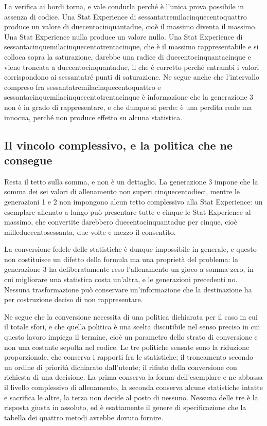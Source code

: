 La verifica ai bordi torna, e vale condurla perché è l'unica prova possibile in assenza di codice. Una Stat Experience di sessantatremilacinquecentoquattro produce un valore di duecentocinquantadue, cioè il massimo diventa il massimo. Una Stat Experience nulla produce un valore nullo. Una Stat Experience di sessantacinquemilacinquecentotrentacinque, che è il massimo rappresentabile e si colloca sopra la saturazione, darebbe una radice di duecentocinquantacinque e viene troncata a duecentocinquantadue, il che è corretto perché entrambi i valori corrispondono ai sessantatré punti di saturazione. Ne segue anche che l'intervallo compreso fra sessantatremilacinquecentoquattro e sessantacinquemilacinquecentotrentacinque è informazione che la generazione 3 non è in grado di rappresentare, e che dunque si perde: è una perdita reale ma innocua, perché non produce effetto su alcuna statistica.

\subsection{Il vincolo complessivo, e la politica che ne consegue}

Resta il tetto sulla somma, e non è un dettaglio. La generazione 3 impone che la somma dei sei valori di allenamento non superi cinquecentodieci, mentre le generazioni 1 e 2 non impongono alcun tetto complessivo alla Stat Experience: un esemplare allenato a lungo può presentare tutte e cinque le Stat Experience al massimo, che convertite darebbero duecentocinquantadue per cinque, cioè milleduecentosessanta, due volte e mezzo il consentito.

La conversione fedele delle statistiche è dunque impossibile in generale, e questo non costituisce un difetto della formula ma una proprietà del problema: la generazione 3 ha deliberatamente reso l'allenamento un gioco a somma zero, in cui migliorare una statistica costa un'altra, e le generazioni precedenti no. Nessuna trasformazione può conservare un'informazione che la destinazione ha per costruzione deciso di non rappresentare.

Ne segue che la conversione necessita di una politica dichiarata per il caso in cui il totale sfori, e che quella politica è una scelta discutibile nel senso preciso in cui questo lavoro impiega il termine, cioè un parametro dello strato di conversione e non una costante sepolta nel codice. Le tre politiche sensate sono la riduzione proporzionale, che conserva i rapporti fra le statistiche; il troncamento secondo un ordine di priorità dichiarato dall'utente; il rifiuto della conversione con richiesta di una decisione. La prima conserva la forma dell'esemplare e ne abbassa il livello complessivo di allenamento, la seconda conserva alcune statistiche intatte e sacrifica le altre, la terza non decide al posto di nessuno. Nessuna delle tre è la risposta giusta in assoluto, ed è esattamente il genere di specificazione che la tabella dei quattro metodi avrebbe dovuto fornire.

